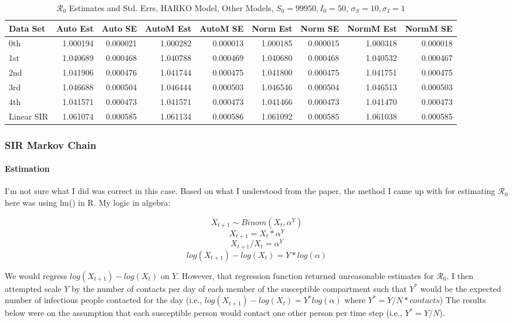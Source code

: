 \documentclass[12pt]{article}
\newcommand{\rr}{\ensuremath{\mathcal{R}_0}}
\begin{document}
\begin{table}[H]
	
	\caption{$\rr$ Estimates and Std. Errs, HARKO Model,
		Other Models, $S_0 = 99950, I_0 = 50$, 
		$\sigma_S = 10, \sigma_I = 1$}
	\begin{footnotesize}
		\hskip -1cm
	\begin{tabular}{l|r|r|r|r|r|r|r|r}
		\hline
		Data Set & Auto Est & Auto SE & AutoM Est & AutoM SE & Norm Est & Norm SE & NormM Est & NormM SE\\
		\hline
		0th & 1.000194 & 0.000021  & 1.000282 & 0.000013 & 1.000185 & 0.000015 & 1.000318 & 0.000018\\
		\hline
		1st & 1.040689 & 0.000468 & 1.040788 & 0.000469 & 1.040680 & 0.000468 & 1.040532 & 0.000467\\
		\hline
		2nd & 1.041906 & 0.000476 & 1.041744 & 0.000475 & 1.041800 & 0.000475 & 1.041751 & 0.000475\\
		\hline
		3rd & 1.046688 & 0.000504 & 1.046444 & 0.000503 & 1.046546 & 0.000504 & 1.046513 & 0.000503\\
		\hline
		4th & 1.041571 & 0.000473 & 1.041571 & 0.000473 & 1.041466 & 0.000473 & 1.041470 & 0.000473\\
		\hline
		Linear SIR & 1.061074 & 0.000585 & 1.061134 & 0.000586 & 1.061092 & 0.000585 & 1.061038 & 0.000585\\
		\hline
	\end{tabular}
\end{footnotesize}
\end{table}

\subsubsection{SIR Markov Chain}

\paragraph{Estimation}

I'm not sure what I did was correct in this case. Based on what I understood from the paper, the method I came up with for estimating $\rr$ here was using lm() in R. My logic in algebra:

$$X_{t+1} \sim Binom(X_{t}, \alpha^Y)$$ $$ X_{t+1} = X_{t} * \alpha^Y$$ $$X _{t+1} / X_{t} = \alpha^Y$$ $$log(X _{t+1}) - log(X_{t}) = Y * log(\alpha)$$

We would regress $log(X _{t+1}) - log(X_{t})$ on $Y$. However, that regression function returned unreasonable estimates for $\rr$. I then attempted scale $Y$ by the number of contacts per day of each member of the susceptible compartment such that $Y^*$ would be the expected number of infectious people contacted for the day (i.e., $log(X _{t+1}) - log(X_{t}) = Y^* log(\alpha)$ where $Y^* = Y/N * contacts$) The results below were on the assumption that each susceptible person would contact one other person per time step (i.e., $Y^* = Y/N$).
\end{document}
